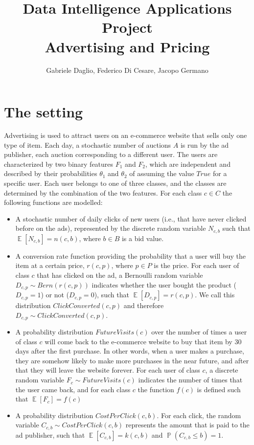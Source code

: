 \documentclass[11pt]{article} %
\title{Data Intelligence Applications Project\\Advertising and Pricing}
\author{Gabriele Daglio, Federico Di Cesare, Jacopo Germano}
\DeclareMathOperator{\EX}{\mathbb{E}}
\DeclareMathOperator{\Prob}{\mathbb{P}}
\begin{document}
\maketitle

\section{The setting}

Advertising is used to attract users on an e-commerce website that sells only one type of item. Each day, a stochastic number of auctions $A$ is run by the ad publisher, each auction corresponding to a different user. The users are characterized by two binary features $F_1$ and $F_2$, which are independent and described by their probabilities $\theta_1$ and $\theta_2$ of assuming the value $True$ for a specific user.
Each user belongs to one of three classes, and the classes are determined by the combination of the two features. 
For each class $c \in C$ the following functions are modelled:
\begin{itemize}
\item A stochastic number of daily clicks of new users (i.e., that have never clicked before on the ads), represented by the discrete random variable $N_{c,b}$ such that $\EX[N_{c,b}] = n(c,b)$, where $b \in B$ is a bid value.
\item A conversion rate function providing the probability that a user will buy the item at a certain price,  $r(c,p)$, where $p \in P$ is the price. For each user of class $c$ that has clicked on the ad, a Bernoulli random variable $D_{c,p} \sim Bern(r(c,p))$ indicates whether the user bought the product ($D_{c,p}=1$) or not ($D_{c,p}=0$), such that $\EX[D_{c,p}]=r(c,p)$. We call this distribution $ClickConverted(c,p)$ and therefore $D_{c,p} \sim ClickConverted(c,p)$.
\item A probability distribution $FutureVisits(c)$ over the number of times a user of class $c$ will come back to the e-commerce website to buy that item by 30 days after the first purchase. In other words, when a user makes a purchase, they are somehow likely to make more purchases in the near future, and after that they will leave the website forever. For each user of class $c$, a discrete random variable $F_c \sim FutureVisits(c)$ indicates the number of times that the user came back, and for each class $c$ the function $f(c)$ is defined such that $\EX[F_c] = f(c)$
\item A probability distribution $CostPerClick(c,b)$. For each click, the random variable $C_{c,b}\sim CostPerClick(c,b)$ represents the amount that is paid to the ad publisher, such that $\EX[C_{c,b}] = k(c,b)$ and $\Prob(C_{c,b} \leq b) = 1$.
\end{itemize}
\end{document}

